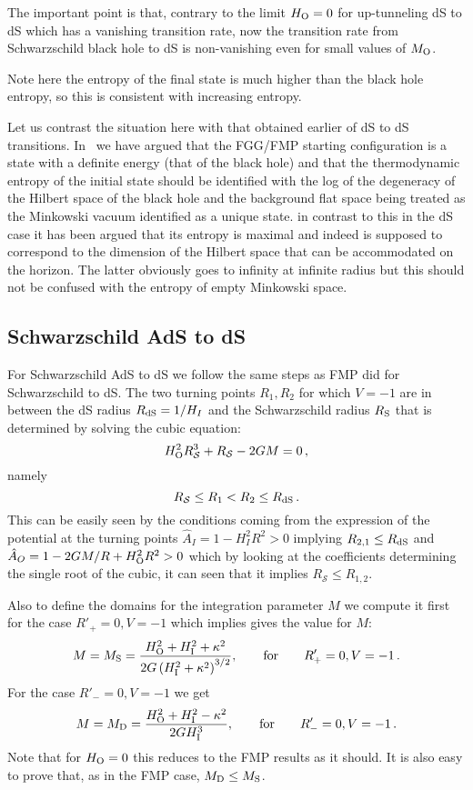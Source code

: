 \documentclass[a4paper,11pt]{article}
\numberwithin{equation}{section}
\newcommand{\be}{\begin{equation}}
\newcommand{\ee}{\end{equation}}
\numberwithin{equation}{section}
\begin{document}
The important point is that, contrary to the limit $H_{\rm O} = 0$ for up-tunneling dS to dS which has a vanishing transition rate, now the transition rate from Schwarzschild black hole to dS is non-vanishing even for small values of $M_{\rm O}$.

Note  here the entropy of the final state is much higher than the
black hole entropy, so this is consistent with increasing entropy.



Let us contrast the situation here with that obtained earlier of dS to dS transitions.
In~\cite{DeAlwis:2019rxg} we have argued that the FGG/FMP starting configuration is a state with a definite energy (that of the black hole) and that the thermodynamic entropy of the initial state should be identified with the log of the degeneracy of the Hilbert space of the black hole and the background flat space being treated as the Minkowski vacuum identified as a unique state. in contrast to this 
in the dS case it has been argued that its entropy is maximal and indeed is supposed to correspond to the dimension of the Hilbert space that can be accommodated on the horizon. The latter obviously goes to infinity at infinite radius but this should not be confused with the entropy of empty Minkowski space.



\subsection{Schwarzschild AdS to dS}


For Schwarzschild AdS to dS we follow the same steps as FMP did for Schwarzschild to dS. The two turning points $R_{1}, R_{2}$ for which $V=-1$ are in between the dS radius $R_{\rm dS}=1/H_I$ and the Schwarzschild radius $R_{\rm S}$ that is determined by solving the cubic equation:
\be
H_{\rm O}^2R_{\mathcal S}^3+R_{\mathcal S}-2GM=0 \,,
\ee
namely
\be
R_{\mathcal S}\leq R_{1} < R_{2} \leq R_{\rm dS} \,.
\ee
This can be easily seen by the conditions coming from the expression of the potential at the turning points $\hat A_I=1-H_I^2R^2>0$ implying $R_{2,1}\leq R_{\rm dS}$ and $\hat A_O=1-2GM/R+H_{\rm O}^2R^2 >0$ which by looking at the coefficients determining the single root of  the cubic, it can seen that it implies $R_{\mathcal S}\leq R_{{1, 2}}$.

Also to define the domains for the integration parameter $M$ we compute it first for the case $R'_+=0, V=-1$ which implies gives the value for $M$:
\be
M=M_{\rm S} =\frac{H_{\rm O}^2+H_{\rm I}^2+\kappa^2}{2G\left(H_{\rm I}^2+\kappa^2 \right)^{3/2}}, \qquad {\rm for} \qquad R'_+=0, V=-1 \,.
\ee
For the case $R'_-=0, V=-1$ we get
\be
M=M_{\rm D}=\frac{H_{\rm O}^2+H_{\rm I}^2-\kappa^2}{2GH_{\rm I}^3},  \qquad {\rm for} \qquad R'_-=0, V=-1 \,.
\ee
Note that for $H_{\rm O}=0$ this reduces to the FMP results as it should. It is also easy to prove that, as in the FMP case, $M_{\rm D}\leq M_{\rm S}$.
\end{document}
